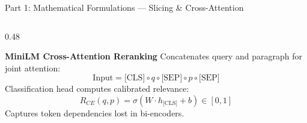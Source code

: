 \documentclass[10pt,aspectratio=169]{beamer}
\begin{document}
\begin{frame}{Part 1: Mathematical Formulations --- Slicing \& Cross-Attention}
\begin{columns}[onlytextwidth,T]
        \begin{column}{0.48\textwidth}
            \begin{block}{\textbf{MiniLM Cross-Attention Reranking}}
                \footnotesize
                Concatenates query and paragraph for joint attention:
                \vspace{-2pt}
                \[ \text{Input} = \text{[CLS]} \circ q \circ \text{[SEP]} \circ p \circ \text{[SEP]} \]
                \vspace{-4pt}
                Classification head computes calibrated relevance:
                \vspace{-2pt}
                \[ R_{CE}(q, p) = \sigma(W \cdot h_{\text{[CLS]}} + b) \in [0, 1] \]
                \vspace{-4pt}
                Captures token dependencies lost in bi-encoders.
            \end{block}
        \end{column}
    \end{columns}
\end{frame}
\end{document}
